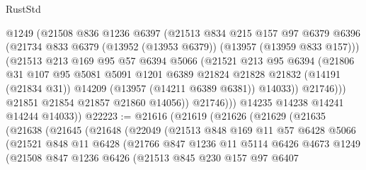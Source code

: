 \begin{lexlean}{RustStd}
\begin{coremodule}
                  @1249
                  (@21508
                    @836
                    @1236
                    @6397
                    (@21513
                      @834
                      @215
                      @157
                      @97
                      @6379
                      @6396
                      (@21734 @833 @6379 (@13952 (@13953 @6379)) (@13957 (@13959 @833 @157)))
                      (@21513
                        @213
                        @169
                        @95
                        @57
                        @6394
                        @5066
                        (@21521
                          @213
                          @95
                          @6394
                          (@21806
                            @31
                            @107
                            @95
                            @5081
                            @5091
                            @1201
                            @6389
                            @21824
                            @21828
                            @21832
                            (@14191 (@21834 @31))
                            @14209
                            (@13957 (@14211 @6389 @6381))
                            @14033))
                        @21746)))
                  @21851
                  @21854
                  @21857
                  @21860
                  @14056))
              @21746)))
        @14235
        @14238
        @14241
        @14244
        @14033))
@22223 := @21616
    (@21619
      (@21626
        (@21629
          (@21635
            (@21638
              (@21645
                (@21648
                  (@22049
                    (@21513
                      @848
                      @169
                      @11
                      @57
                      @6428
                      @5066
                      (@21521
                        @848
                        @11
                        @6428
                        (@21766
                          @847
                          @1236
                          @11
                          @5114
                          @6426
                          @4673
                          @1249
                          (@21508
                            @847
                            @1236
                            @6426
                            (@21513
                              @845
                              @230
                              @157
                              @97
                              @6407

\end{coremodule}
\end{lexlean}
